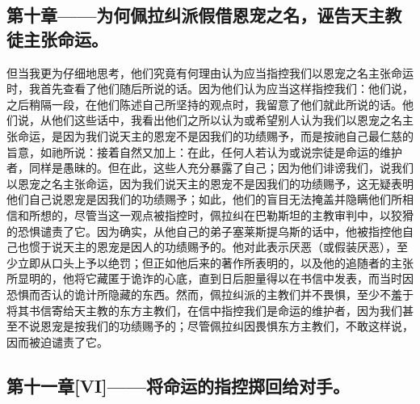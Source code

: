 \subsection{第十章——为何佩拉纠派假借恩宠之名，诬告天主教徒主张命运。}

但当我更为仔细地思考，他们究竟有何理由认为应当指控我们以恩宠之名主张命运时，我首先查看了他们随后所说的话。因为他们认为应当这样指控我们：他们说，之后稍隔一段，在他们陈述自己所坚持的观点时，我留意了他们就此所说的话。他们说，从他们这些话中，我看出他们之所以认为或希望别人认为我们以恩宠之名主张命运，是因为我们说天主的恩宠不是因我们的功绩赐予，而是按祂自己最仁慈的旨意，如祂所说：接着自然又加上：在此，任何人若认为或说宗徒是命运的维护者，同样是愚昧的。但在此，这些人充分暴露了自己；因为他们诽谤我们，说我们以恩宠之名主张命运，因为我们说天主的恩宠不是因我们的功绩赐予，这无疑表明他们自己说恩宠是因我们的功绩赐予；如此，他们的盲目无法掩盖并隐瞒他们所相信和所想的，尽管当这一观点被指控时，佩拉纠在巴勒斯坦的主教审判中，以狡猾的恐惧谴责了它。因为确实，从他自己的弟子塞莱斯提乌斯的话中，他被指控他自己也惯于说天主的恩宠是因人的功绩赐予的。他对此表示厌恶（或假装厌恶），至少立即从口头上予以绝罚；但正如他后来的著作所表明的，以及他的追随者的主张所显明的，他将它藏匿于诡诈的心底，直到日后胆量得以在书信中发表，而当时因恐惧而否认的诡计所隐藏的东西。然而，佩拉纠派的主教们并不畏惧，至少不羞于将其书信寄给天主教的东方主教们，在信中指控我们是命运的维护者，因为我们甚至不说恩宠是按我们的功绩赐予的；尽管佩拉纠因畏惧东方主教们，不敢这样说，因而被迫谴责了它。\par


\subsection{第十一章[VI]——将命运的指控掷回给对手。}


